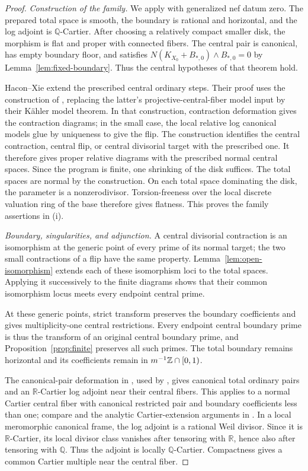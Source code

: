\documentclass[11pt,a4paper]{article}
\numberwithin{equation}{section}
\theoremstyle{definition}
\theoremstyle{remark}
\newcommand{\Q}{\mathbb Q}\newcommand{\R}{\mathbb R}
\begin{document}
\begin{proof}
\emph{Construction of the family.}
We apply \cite[Theorem~7.7]{HX2026} with generalized nef datum
zero. The prepared total space is smooth, the boundary is rational
and horizontal, and the log adjoint is $\Q$-Cartier.
After choosing a relatively compact smaller disk, the morphism is
flat and proper with connected fibers. The central pair is canonical,
has empty boundary floor, and satisfies
$N(K_{X_0}+B_{*,0})\wedge B_{*,0}=0$ by
Lemma~\ref{lem:fixed-boundary}. Thus the central hypotheses of that theorem hold.

Hacon--Xie extend the prescribed central ordinary steps. Their proof
uses the construction of \cite[Proposition~4.16]{HLR2026}, replacing
the latter's projective-central-fiber model input by their Kähler
model theorem. In that construction, contraction deformation gives
the contraction diagrams; in the small case, the local relative log
canonical models glue by uniqueness to give the flip. The construction
identifies the central contraction, central flip, or central
divisorial target with the prescribed one. It therefore gives proper relative diagrams with the prescribed
normal central spaces. Since the program is finite, one shrinking
of the disk suffices.
The total spaces are normal by the construction. On each total space dominating the disk, the parameter is a
nonzerodivisor. Torsion-freeness over the local discrete valuation
ring of the base therefore gives flatness. This proves the family assertions in (i).

\smallskip\noindent\emph{Boundary, singularities, and adjunction.}
A central divisorial contraction is an isomorphism at the generic
point of every prime of its normal target; the two small contractions
of a flip have the same property. Lemma~\ref{lem:open-isomorphism}
extends each of these isomorphism loci to the total spaces. Applying
it successively to the finite diagrams shows that their common
isomorphism locus meets every endpoint central prime.

At these generic points, strict transform preserves the boundary
coefficients and gives multiplicity-one central restrictions.
Every endpoint central boundary prime is thus the transform of an
original central boundary prime, and Proposition~\ref{prop:finite}
preserves all such primes. The total boundary remains horizontal
and its coefficients remain in $m^{-1}\mathbb Z\cap[0,1)$.

The canonical-pair deformation in
\cite[Proposition~4.16]{HLR2026}, used
by \cite[Theorem~7.7]{HX2026}, gives canonical total ordinary pairs
and an $\R$-Cartier log adjoint near their central fibers. This applies to a normal Cartier central fiber with canonical
restricted pair and boundary coefficients less than one; compare \cite[Proposition~3.5]{dFH2011} and the analytic
Cartier-extension arguments in \cite[Section~12.1]{KM1992}.
In a local meromorphic canonical frame, the log adjoint is a
rational Weil divisor. Since it is $\R$-Cartier, its local divisor
class vanishes after tensoring with $\R$, hence also after
tensoring with $\Q$. Thus the adjoint is locally $\Q$-Cartier. Compactness gives
a common Cartier multiple near the central fiber.


\end{proof}
\end{document}
